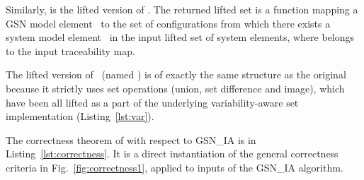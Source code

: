 Similarly, \lift{\trace} is the lifted version of \trace. The returned lifted set is a function mapping a GSN model element ~to the set of configurations from which there exists a system model element ~in the input lifted set of system elements, where  belongs to the input traceability map.

The lifted version of \createAnnotation~(named \lift{\createAnnotation}) is of exactly the same structure as the original because it strictly uses set operations (union, set difference and image), which have been all lifted as a part of the underlying variability-aware set implementation (Listing~\ref{lst:var}).



%	
%	
%	
%	
%	



The correctness theorem of  with respect to GSN\_IA is in Listing~\ref{lst:correctness}. It is a direct instantiation of the general correctness criteria in Fig.~\ref{fig:correctness1}, applied to inputs of the GSN\_IA algorithm.
